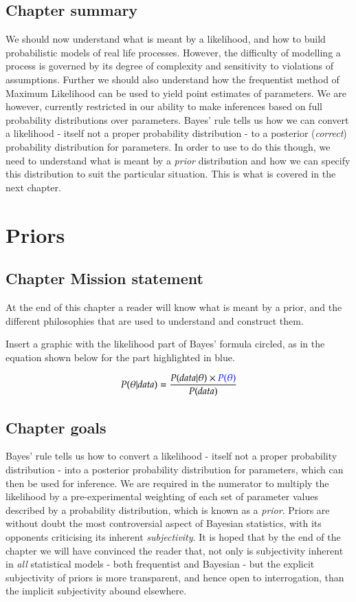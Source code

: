 \documentclass[11pt,fullpage]{book}
\begin{document}
\section{Chapter summary}
We should now understand what is meant by a likelihood, and how to build probabilistic models of real life processes. However, the difficulty of modelling a process is governed by its degree of complexity and sensitivity to violations of assumptions. Further we should also understand how the frequentist method of Maximum Likelihood can be used to yield point estimates of parameters. We are however, currently restricted in our ability to make inferences based on full probability distributions over parameters. Bayes' rule tells us how we can convert a likelihood - itself not a proper probability distribution - to a posterior (\textit{correct}) probability distribution for parameters. In order to use to do this though, we need to understand what is meant by a \textit{prior} distribution and how we can specify this distribution to suit the particular situation. This is what is covered in the next chapter.

\chapter{Priors}\label{chap:Prior}
\section{Chapter Mission statement}
At the end of this chapter a reader will know what is meant by a prior, and the different philosophies that are used to understand and construct them. 

Insert a graphic with the likelihood part of Bayes' formula circled, as in the equation shown below for the part highlighted in blue.

\begin{equation}
P(\theta|data) = \frac{P(data|\theta)\times {\color{blue}P(\theta)}}{P(data)}
\end{equation}\label{eq:Prior_BayesHighlighted}

\section{Chapter goals}
Bayes' rule tells us how to convert a likelihood - itself not a proper probability distribution - into a posterior probability distribution for parameters, which can then be used for inference. We are required in the numerator to multiply the likelihood by a pre-experimental weighting of each set of parameter values described by a probability distribution, which is known as a \textit{prior}. Priors are without doubt the most controversial aspect of Bayesian statistics, with its opponents criticising its inherent \textit{subjectivity}. It is hoped that by the end of the chapter we will have convinced the reader that, not only is subjectivity inherent in \textit{all} statistical models - both frequentist and Bayesian - but the explicit subjectivity of priors is more transparent, and hence open to interrogation, than the implicit subjectivity abound elsewhere.
\end{document}
